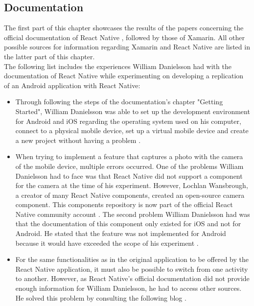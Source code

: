 \documentclass[Bachelor,BIF,english]{twbook}
\begin{document}
\subsection{Documentation}
The first part of this chapter showcases the results of the papers concerning the official documentation of React Native , followed by those of Xamarin. All other possible sources for information regarding Xamarin and React Native are listed in the latter part of this chapter. 
\\[\baselineskip]
The following list includes the experiences William Danielsson had with the documentation of
React Native \cite{ReactNativeDoc} while experimenting on developing a replication of an Android application with React Native: 
\begin{itemize}
\item Through following the steps of the documentation’s chapter "Getting Started", William Danielsson was able to set up the development environment for Android and iOS regarding the operating system used on his computer, connect to a physical mobile device, set up a virtual mobile device and create a new project without having a problem \cite[p.~18]{Danielsson_2016}.
\item When trying to implement a feature that captures a photo with the camera of the mobile device, multiple errors occurred. One of the problems William Danielsson had to face was that React Native did not support a component for the camera at the time of his experiment. However, Lochlan Wansbrough, a creator of many React Native components, created an open-source camera component. This components repository \cite{ReactNativeCamera} is now part of the official React Native community account \cite{ReactNativeCommunity}. The second problem William Danielsson had was that the documentation of this component only existed for iOS and not for Android. He stated that the feature was not implemented for Android because it would have exceeded the scope of his experiment \cite[p.~23-24]{Danielsson_2016}.
\item For the same functionalities as in the original application to be offered by the React Native application, it must also be possible to switch from one activity to another. However, as React Native’s official documentation did not provide enough information for William Danielsson, he had to access other sources. He solved this problem by consulting the following blog
\cite[p.~51]{Danielsson_2016} \cite{ReactNativeBlog}.
\end{itemize}
\end{document}
